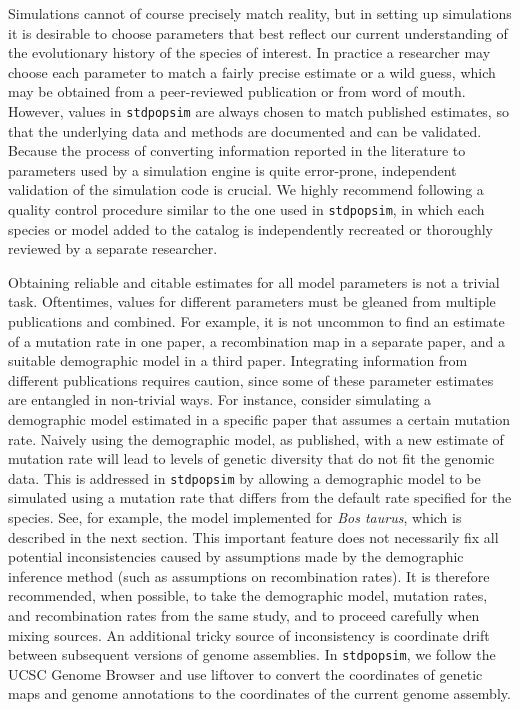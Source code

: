 \documentclass[hidelinks]{article}
\newcommand{\stdpopsim}{\texttt{stdpopsim}\xspace}
\begin{document}
Simulations cannot of course precisely match reality, but in setting up simulations
it is desirable to choose parameters that best reflect our current understanding of the evolutionary history of the species of interest.
In practice a researcher may choose each parameter to match a fairly precise estimate or a wild guess,
which may be obtained from a peer-reviewed publication or from word of mouth.
However, values in \stdpopsim are always chosen to match published estimates,
so that the underlying data and methods are documented and can be validated.
Because the process of converting information reported in the literature to parameters used by a simulation engine is quite error-prone,
independent validation of the simulation code is crucial.
We highly recommend following a quality control procedure similar to the one used in \stdpopsim,
in which each species or model added to the catalog is independently recreated or thoroughly reviewed by a separate researcher.


Obtaining reliable and citable estimates for all model parameters is not a trivial task.
Oftentimes, values for different parameters must be gleaned from multiple publications and combined.
For example, it is not uncommon to find an estimate of a mutation rate in one paper,
a recombination map in a separate paper, and a suitable demographic model in a third paper.
Integrating information from different publications requires caution,
since some of these parameter estimates are entangled in non-trivial ways.
For instance, consider simulating a demographic model estimated in a specific paper that assumes
a certain mutation rate.
Naively using the demographic model, as published, with a new estimate of mutation rate
will lead to levels of genetic diversity that do not fit the genomic data.
This is addressed in \stdpopsim by allowing a demographic model to be simulated using a mutation rate that differs from the default rate specified for the species.
See, for example, the model implemented for \emph{Bos taurus},
which is described in the next section.
This important feature does not necessarily fix all potential inconsistencies
caused by assumptions made by the demographic inference method
(such as assumptions on recombination rates).
It is therefore recommended, when possible, to take the demographic model,
mutation rates, and recombination rates from the same study,
and to proceed carefully when mixing sources.
An additional tricky source of inconsistency is coordinate drift between 
subsequent versions of genome assemblies.
In \stdpopsim, we follow the UCSC Genome Browser
and use liftover to convert the coordinates of genetic maps and genome annotations
to the coordinates of the current genome assembly.
\end{document}
